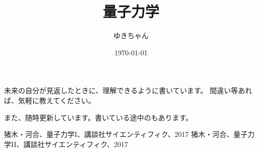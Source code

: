 \documentclass[a4paper,16pt]{jsarticle}
\title{量子力学}
\author{ゆきちゃん}
\date{\today}
\makeatletter
\def\section{\newpage\@startsection {section}{1}{\z@}{-3.5ex plus -1ex minus -.2ex}{2.3 ex plus .2ex}{\Large\bf}}
\makeatother
\begin{document}
\maketitle

未来の自分が見返したときに、理解できるように書いています。
間違い等あれば、気軽に教えてください。

また、随時更新しています。書いている途中のもあります。

\tableofcontents

\newpage

% 

% 

\begin{thebibliography}{99}
	\bibitem{} 猪木・河合、量子力学I、講談社サイエンティフィク、2017
	\bibitem{} 猪木・河合、量子力学II、講談社サイエンティフィク、2017
\end{thebibliography}















\end{document}
